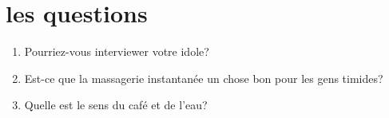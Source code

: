\documentclass[letterpaper]{article}
\begin{document}
\section*{les questions}
\begin{enumerate}
\item
Pourriez-vous interviewer votre idole?
\item
Est-ce que la massagerie instantanée un chose bon pour les gens timides?
\item
Quelle est le sens du café et de l'eau?
\end{enumerate}
\end{document}
